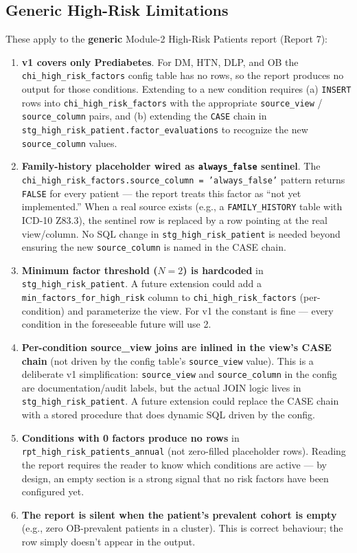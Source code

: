 \documentclass[11pt,a4paper]{article}
\begin{document}
\subsection{Generic High-Risk Limitations}
These apply to the \textbf{generic} Module-2 High-Risk Patients report (Report 7):
\begin{enumerate}[leftmargin=*]
    \item \textbf{v1 covers only Prediabetes}. For DM, HTN, DLP, and OB the \texttt{chi\_high\_risk\_factors} config table has no rows, so the report produces no output for those conditions. Extending to a new condition requires (a) \texttt{INSERT} rows into \texttt{chi\_high\_risk\_factors} with the appropriate \texttt{source\_view} / \texttt{source\_column} pairs, and (b) extending the \texttt{CASE} chain in \texttt{stg\_high\_risk\_patient.factor\_evaluations} to recognize the new \texttt{source\_column} values.
    \item \textbf{Family-history placeholder wired as \texttt{always\_false} sentinel}. The \texttt{chi\_high\_risk\_factors.source\_column = 'always\_false'} pattern returns \texttt{FALSE} for every patient --- the report treats this factor as ``not yet implemented.'' When a real source exists (e.g., a \texttt{FAMILY\_HISTORY} table with ICD-10 Z83.3), the sentinel row is replaced by a row pointing at the real view/column. No SQL change in \texttt{stg\_high\_risk\_patient} is needed beyond ensuring the new \texttt{source\_column} is named in the CASE chain.
    \item \textbf{Minimum factor threshold ($N = 2$) is hardcoded} in \texttt{stg\_high\_risk\_patient}. A future extension could add a \texttt{min\_factors\_for\_high\_risk} column to \texttt{chi\_high\_risk\_factors} (per-condition) and parameterize the view. For v1 the constant is fine --- every condition in the foreseeable future will use 2.
    \item \textbf{Per-condition source\_view joins are inlined in the view's CASE chain} (not driven by the config table's \texttt{source\_view} value). This is a deliberate v1 simplification: \texttt{source\_view} and \texttt{source\_column} in the config are documentation/audit labels, but the actual JOIN logic lives in \texttt{stg\_high\_risk\_patient}. A future extension could replace the CASE chain with a stored procedure that does dynamic SQL driven by the config.
    \item \textbf{Conditions with 0 factors produce no rows} in \texttt{rpt\_high\_risk\_patients\_annual} (not zero-filled placeholder rows). Reading the report requires the reader to know which conditions are active --- by design, an empty section is a strong signal that no risk factors have been configured yet.
    \item \textbf{The report is silent when the patient's prevalent cohort is empty} (e.g., zero OB-prevalent patients in a cluster). This is correct behaviour; the row simply doesn't appear in the output.
\end{enumerate}
\end{document}

